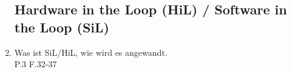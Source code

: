 \documentclass[10pt,a4paper,fleqn]{article}
\begin{document}
\begin{enumerate}
\subsection{Hardware in the Loop (HiL) / Software in the Loop (SiL)}
	\item Was ist SiL/HiL, wie wird es angewandt.\\
		P.3 F.32-37
%
%				
%				
%				
%				
%				
%				

\end{enumerate}
\end{document}
